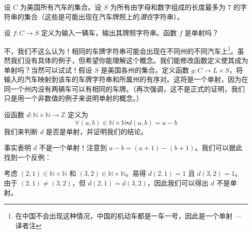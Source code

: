 \begin{example}
    设 $C$ 为美国所有汽车的集合。设 $S$ 为所有由字母和数字组成的长度最多为 $7$ 的字符串的集合（这些是可能出现在汽车牌照上的\emph{潜在}字符串）。

    设 $f : C \to S$ 定义为输入一辆车，输出其牌照字符串。函数 $f$ 是单射吗？

    不，我们不这么认为！相同的车牌字符串可能会出现在不同州的不同汽车上\footnote{在中国不会出现这种情况，中国的机动车都是一车一号，因此是一个单射 --- 译者注}。虽然我们没有具体的例子，但希望你能理解这个概念。我们能修改函数定义使其成为单射吗？当然可以试试！假设 $S$ 是美国各州的集合。定义函数 $g : C \to L \times S$，将输入的汽车映射到该车的车牌字符串和所属州的有序对。这将是一个单射，因为在同一个州内没有两辆车可以有相同的车牌。（再次强调，这不是正式的证明，我们只是用一个非数值的例子来说明单射的概念。）
\end{example}

\begin{example}
    设函数 $d : \mathbb{N} \times \mathbb{N} \to \mathbb{Z}$ 定义为
    \[\forall (a, b) \in \mathbb{N} \times \mathbb{N} \centerdot d(a, b) = a - b\]
    我们来判断 $d$ 是否是单射，并证明我们的结论。

    事实表明 $d$ 不是一个单射！注意到 $a - b = (a + 1) - (b + 1)$。我们可以据此找到一个反例：

    考虑 $(2, 1) \in \mathbb{N} \times \mathbb{N}$ 和 $(3, 2) \in \mathbb{N} \times \mathbb{N}$。易得 $d(2, 1) = 1$ 且 $d(3, 2) = 1$。由于 $(2, 1) \ne (3, 2)$，但 $d(2, 1) = d(3, 2)$，因此我们可以得出 $d$ 不是单射。
\end{example}

